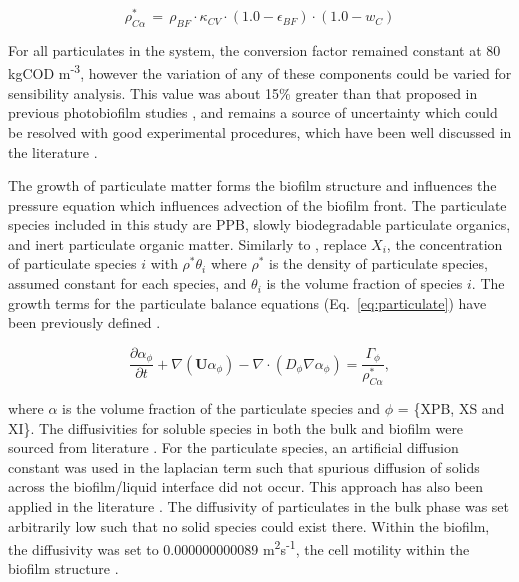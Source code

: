 \begin{equation}
    \label{eq:cod2alpha}
    \rho^*_{C\alpha} \, = \, \rho_{BF} \cdot \kappa_{CV} \cdot (1.0 - \epsilon_{BF}) \cdot (1.0 - w_C)
\end{equation}

For all particulates in the system, the conversion factor remained constant at 80 kgCOD m\textsuperscript{-3}, however the variation of any of these components could be varied for sensibility analysis. This value was about 15\% greater than that proposed in previous photobiofilm studies \cite{polizzi2017}, and remains a source of uncertainty which could be resolved with good experimental procedures, which have been well discussed in the literature \cite{azeredo2017}. 


The growth of particulate matter forms the biofilm structure and influences the pressure equation which influences advection of the biofilm front. The particulate species included in this study are PPB, slowly biodegradable particulate organics, and inert particulate organic matter. Similarly to \cite{alpkvist2007}, replace $X_i$, the concentration of particulate species $i$ with $\rho^*\theta_i$ where $\rho^*$ is the density of particulate species, assumed constant for each species, and $\theta_i$ is the volume fraction of species $i$. The growth terms for the particulate balance equations (Eq.~\ref{eq:particulate}) have been previously defined \cite{puyol2017}.


\begin{equation}
\label{eq:particulate}
\frac{\partial \alpha_{\phi}}{\partial t} + \nabla (\mathbf{U} \alpha_{\phi}) - \nabla \cdot (D_{\phi} \nabla \alpha_{\phi}) = \frac{\Gamma_{\phi}}{\rho^*_{C\alpha}}, 
\end{equation}

where $\alpha$ is the volume fraction of the particulate species and ${\phi}$ = \{XPB, XS and XI\}. The diffusivities for soluble species in both the bulk and biofilm were sourced from literature \cite{stewart2003, stewart1998}. For the particulate species, an artificial diffusion constant was used in the laplacian term such that spurious diffusion of solids across the biofilm/liquid interface did not occur. This approach has also been applied in the literature \cite{haroun2010}. The diffusivity of particulates in the bulk phase was set arbitrarily low such that no solid species could exist there. Within the biofilm, the diffusivity was set to \num{0.000000000089} m\textsuperscript{2}s\textsuperscript{-1}, the cell motility within the biofilm structure \cite{ali2018}.  

